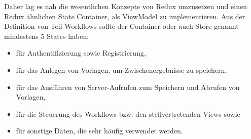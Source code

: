\documentclass[notables, nomenclature, oneside, 150]{HSMW-Thesis}
\begin{document}
		Daher lag es nah die wesentlichen Konzepte von Redux umzusetzen und einen Redux ähnlichen State Container, als ViewModel zu implementieren. Aus der Definition von Teil-Workflows sollte der Container oder auch Store genannt mindestens 5 States haben: 
		\begin{itemize}
			\item für Authentifizierung sowie Registrierung,
			\item für das Anlegen von Vorlagen, um Zwischenergebnisse zu speichern,
			\item für das Ausführen von Server-Aufrufen zum Speichern und Abrufen von Vorlagen, 
			\item für die Steuerung des Workflows bzw. den stellvertretenden Views sowie
			\item für sonstige Daten, die sehr häufig verwendet werden.
		\end{itemize}
		
\end{document}
